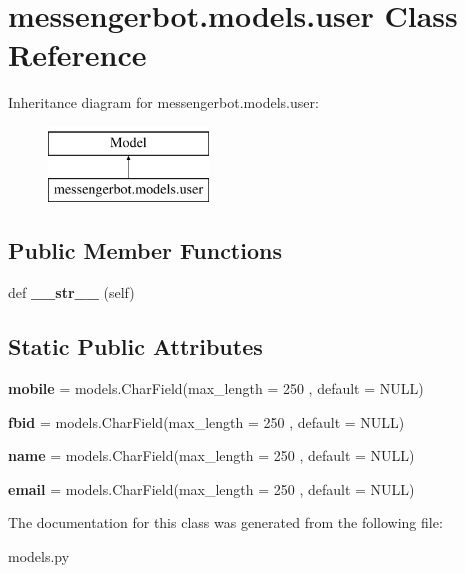 \hypertarget{classmessengerbot_1_1models_1_1user}{}\section{messengerbot.\+models.\+user Class Reference}
\label{classmessengerbot_1_1models_1_1user}
Inheritance diagram for messengerbot.\+models.\+user\+:\begin{figure}[H]
\begin{center}
\leavevmode
\includegraphics[height=2.000000cm]{classmessengerbot_1_1models_1_1user}
\end{center}
\end{figure}
\subsection*{Public Member Functions}
\begin{DoxyCompactItemize}
\item 
\mbox{\label{classmessengerbot_1_1models_1_1user_a3f5e43e7673443ae3715bcb51416a735}} 
def {\bfseries \+\_\+\+\_\+str\+\_\+\+\_\+} (self)
\end{DoxyCompactItemize}
\subsection*{Static Public Attributes}
\begin{DoxyCompactItemize}
\item 
\mbox{\label{classmessengerbot_1_1models_1_1user_a006ce81d6b1219a617fb3a0d1b5c06d1}} 
{\bfseries mobile} = models.\+Char\+Field(max\+\_\+length = 250 , default = \textquotesingle{}N\+U\+LL\textquotesingle{})
\item 
\mbox{\label{classmessengerbot_1_1models_1_1user_a465b6800ae148440932d8984f6770637}} 
{\bfseries fbid} = models.\+Char\+Field(max\+\_\+length = 250 , default = \textquotesingle{}N\+U\+LL\textquotesingle{})
\item 
\mbox{\label{classmessengerbot_1_1models_1_1user_ad88b250ebdac82d889b30f31d6339754}} 
{\bfseries name} = models.\+Char\+Field(max\+\_\+length = 250 , default = \textquotesingle{}N\+U\+LL\textquotesingle{})
\item 
\mbox{\label{classmessengerbot_1_1models_1_1user_a13e9e7fd31136cc8713e0d0f98c6c9aa}} 
{\bfseries email} = models.\+Char\+Field(max\+\_\+length = 250 , default = \textquotesingle{}N\+U\+LL\textquotesingle{})
\end{DoxyCompactItemize}


The documentation for this class was generated from the following file\+:\begin{DoxyCompactItemize}
\item 
models.\+py\end{DoxyCompactItemize}
